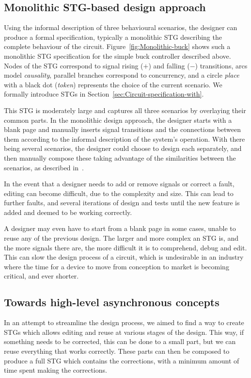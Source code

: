 \documentclass[british, journal]{IEEEtran}
\begin{document}
\subsection{Monolithic STG-based design approach\label{sub:Monolithic}}

Using the informal description of three behavioural scenarios, the designer can
produce a formal specification, typically a monolithic STG describing the
complete behaviour of the circuit. Figure~\ref{fig:Monolithic-buck} shows such
a monolithic STG specification for the simple buck controller described above.
Nodes of the STG correspond to signal rising ($+$) and falling ($-$) transitions,
arcs model \emph{causality}, parallel branches correspond to concurrency, and
a circle \emph{place} with a black dot (\emph{token}) represents the choice of
the current scenario. We formally introduce STGs
in Section~\ref{sec:Circuit-specification-with}.

This STG is moderately large and captures all three scenarios by overlaying
their common parts. In the monolithic design approach, the designer starts with
a blank page and manually inserts signal transitions and the connections between
them according to the informal description of the system's operation. With
there being several scenarios, the designer could choose to design each
separately, and then manually compose these taking advantage of the
similarities between the scenarios, as described
in~\cite{2014_sokolov_ftfc}\cite{sokolov2015design}.

In the event that a designer needs to add or remove signals or correct a fault,
editing can become difficult, due to the complexity and size. This can lead to
further faults, and several iterations of design and tests until the new
feature is added and deemed to be working correctly.

A designer may even have to start from a blank page in some cases, unable to
reuse any of the previous design. The larger and more complex an STG is, and
the more signals there are, the more difficult it is to comprehend,
debug and edit. This can slow the design process of a circuit, which is
undesirable in an industry where the time for a device to move from conception
to market is becoming critical, and ever shorter.

\vspace{-2mm}
\subsection{Towards high-level asynchronous concepts\label{sub:new-way}}
In an attempt to streamline the design process, we aimed to find a way to
create STGs which allows editing and reuse at various stages of the design.
This way, if something needs to be corrected, this can be done to a small part,
but we can reuse everything that works correctly. These parts can then be
composed to produce a full STG which contains the corrections, with a minimum
amount of time spent making the corrections.
\end{document}
